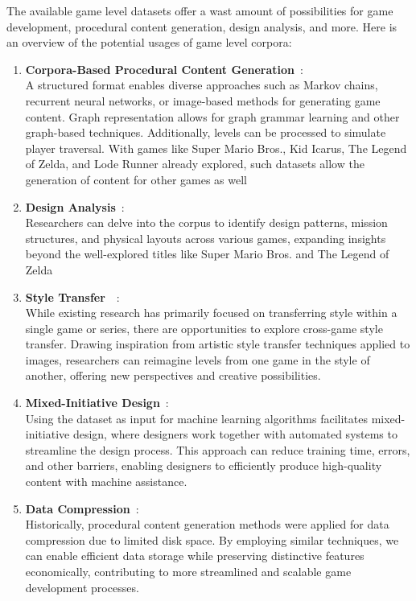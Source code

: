 \documentclass[runningheads]{llncs}
\begin{document}
The available game level datasets offer a wast amount of possibilities for game development, procedural content generation, design analysis, and more. Here is an overview of the potential usages of game level corpora:
\begin{enumerate}
\item \textbf{Corpora-Based Procedural Content Generation}~\cite{ref_article16}:\\
A structured format enables diverse approaches such as Markov chains, recurrent neural networks, or image-based methods for generating game content. Graph representation allows for graph grammar learning and other graph-based techniques. Additionally, levels can be processed to simulate player traversal. With games like Super Mario Bros., Kid Icarus, The Legend of Zelda, and Lode Runner already explored, such datasets allow the generation of content for other games as well\\

\item \textbf{Design Analysis}~\cite{ref_article16}:\\
Researchers can delve into the corpus to identify design patterns, mission structures, and physical layouts across various games, expanding insights beyond the well-explored titles like Super Mario Bros. and The Legend of Zelda\\

\item \textbf{Style Transfer}~\cite{ref_article15}~\cite{ref_article16}:\\
While existing research has primarily focused on transferring style within a single game or series, there are opportunities to explore cross-game style transfer. Drawing inspiration from artistic style transfer techniques applied to images, researchers can reimagine levels from one game in the style of another, offering new perspectives and creative possibilities.\\

\item \textbf{Mixed-Initiative Design}~\cite{ref_article15}:\\
Using the dataset as input for machine learning algorithms facilitates mixed-initiative design, where designers work together with automated systems to streamline the design process. This approach can reduce training time, errors, and other barriers, enabling designers to efficiently produce high-quality content with machine assistance.\\

\item \textbf{Data Compression}~\cite{ref_article15}:\\
Historically, procedural content generation methods were applied for data compression due to limited disk space. By employing similar techniques, we can enable efficient data storage while preserving distinctive features economically, contributing to more streamlined and scalable game development processes.

\end{enumerate}
\end{document}
